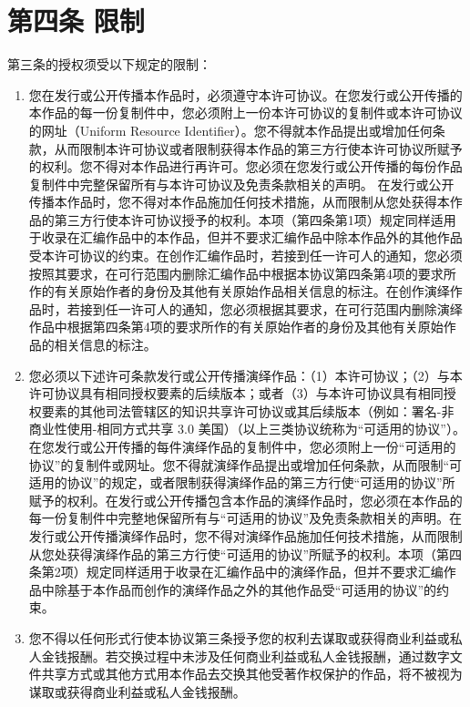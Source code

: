 \section{第四条 限制}
第三条的授权须受以下规定的限制： 
\begin{enumerate}
	\item 您在发行或公开传播本作品时，必须遵守本许可协议。在您发行或公开传播的本作品的每一份复制件中，您必须附上一份本许可协议的复制件或本许可协议的网址（Uniform Resource Identifier）。您不得就本作品提出或增加任何条款，从而限制本许可协议或者限制获得本作品的第三方行使本许可协议所赋予的权利。您不得对本作品进行再许可。您必须在您发行或公开传播的每份作品复制件中完整保留所有与本许可协议及免责条款相关的声明。 在发行或公开传播本作品时，您不得对本作品施加任何技术措施，从而限制从您处获得本作品的第三方行使本许可协议授予的权利。本项（第四条第1项）规定同样适用于收录在汇编作品中的本作品，但并不要求汇编作品中除本作品外的其他作品受本许可协议的约束。在创作汇编作品时，若接到任一许可人的通知，您必须按照其要求，在可行范围内删除汇编作品中根据本协议第四条第4项的要求所作的有关原始作者的身份及其他有关原始作品相关信息的标注。在创作演绎作品时，若接到任一许可人的通知，您必须根据其要求，在可行范围内删除演绎作品中根据第四条第4项的要求所作的有关原始作者的身份及其他有关原始作品的相关信息的标注。
	\item 您必须以下述许可条款发行或公开传播演绎作品：（1）本许可协议；（2）与本许可协议具有相同授权要素的后续版本；或者（3）与本许可协议具有相同授权要素的其他司法管辖区的知识共享许可协议或其后续版本（例如：署名-非商业性使用-相同方式共享 3.0 美国）（以上三类协议统称为“可适用的协议”）。在您发行或公开传播的每件演绎作品的复制件中，您必须附上一份“可适用的协议”的复制件或网址。您不得就演绎作品提出或增加任何条款，从而限制“可适用的协议”的规定，或者限制获得演绎作品的第三方行使“可适用的协议”所赋予的权利。在发行或公开传播包含本作品的演绎作品时，您必须在本作品的每一份复制件中完整地保留所有与“可适用的协议”及免责条款相关的声明。在发行或公开传播演绎作品时，您不得对演绎作品施加任何技术措施，从而限制从您处获得演绎作品的第三方行使“可适用的协议”所赋予的权利。本项（第四条第2项）规定同样适用于收录在汇编作品中的演绎作品，但并不要求汇编作品中除基于本作品而创作的演绎作品之外的其他作品受“可适用的协议”的约束。 
	\item 您不得以任何形式行使本协议第三条授予您的权利去谋取或获得商业利益或私人金钱报酬。若交换过程中未涉及任何商业利益或私人金钱报酬，通过数字文件共享方式或其他方式用本作品去交换其他受著作权保护的作品，将不被视为谋取或获得商业利益或私人金钱报酬。

\end{enumerate}

